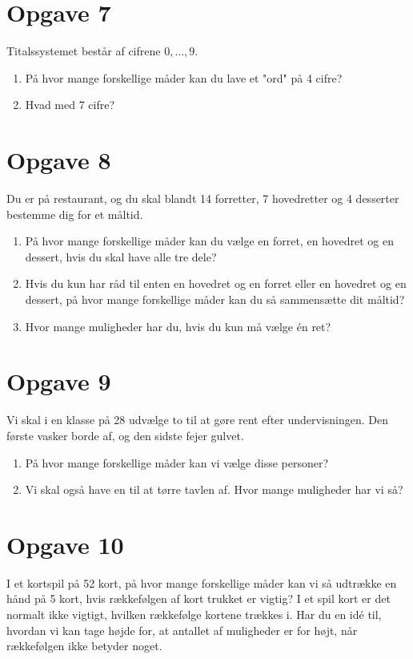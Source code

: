 \section*{Opgave 7}
Titalssystemet består af cifrene $0,\hdots,9$. 
\begin{enumerate}[label=\roman*)]
	\item På hvor mange forskellige måder kan du lave et "ord" på 4 cifre?
	\item Hvad med 7 cifre?
\end{enumerate}

\section*{Opgave 8}
Du er på restaurant, og du skal blandt 14 forretter, 7 hovedretter og 4 desserter bestemme dig for et måltid. 
\begin{enumerate}[label=\roman*)]
\item På hvor mange forskellige måder kan du vælge en forret, en hovedret og en dessert, hvis du skal have alle tre dele?
\item Hvis du kun har råd til enten en hovedret og en forret eller en hovedret og en dessert, på hvor mange forskellige måder kan du så sammensætte dit måltid?
\item Hvor mange muligheder har du, hvis du kun må vælge én ret?
\end{enumerate}


\section*{Opgave 9}
Vi skal i en klasse på 28 udvælge to til at gøre rent efter undervisningen. Den første vasker borde af, og den sidste fejer gulvet. 
\begin{enumerate}[label=\roman*)]

\item På hvor mange forskellige måder kan vi vælge disse personer?
\item Vi skal også have en til at tørre tavlen af. Hvor mange muligheder har vi så?

\end{enumerate}
\section*{Opgave 10}
I et kortspil på 52 kort, på hvor mange forskellige måder kan vi så udtrække en hånd på 5 kort, hvis rækkefølgen af kort trukket er vigtig? I et spil kort er det normalt ikke vigtigt, hvilken rækkefølge kortene trækkes i. Har du en idé til, hvordan vi kan tage højde for, at antallet af muligheder er for højt, når rækkefølgen ikke betyder noget. 
